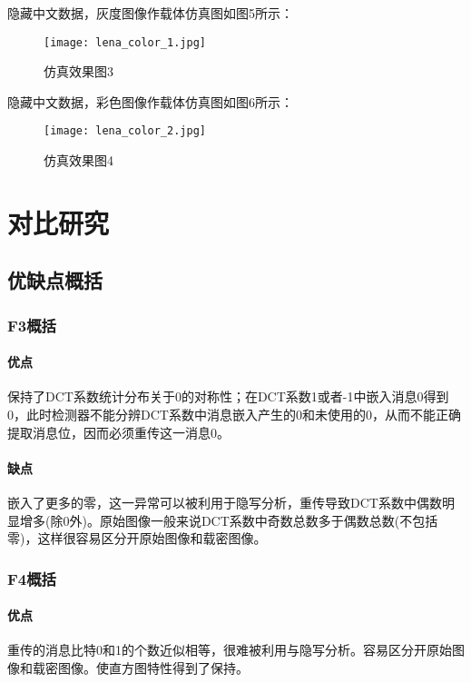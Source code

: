 \documentclass[onecolumn,a4paper,12pt]{article}
\begin{document}
隐藏中文数据，灰度图像作载体仿真图如图5所示：
\begin{figure}[H]
  \centering
  \texttt{[image: lena\_color\_1.jpg]}\\
  \caption{仿真效果图3}\label{仿真效果图3}
\end{figure}

隐藏中文数据，彩色图像作载体仿真图如图6所示：
\begin{figure}[H]
  \centering
  \texttt{[image: lena\_color\_2.jpg]}\\
  \caption{仿真效果图4}\label{仿真效果图4}
\end{figure}


\section{对比研究}

\subsection{优缺点概括}

\subsubsection{F3概括}

\paragraph*{优点}
保持了DCT系数统计分布关于0的对称性；在DCT系数1或者-1中嵌入消息0得到0，此时检测器不能分辨DCT系数中消息嵌入产生的0和未使用的0，从而不能正确提取消息位，因而必须重传这一消息0。

\paragraph*{缺点}
嵌入了更多的零，这一异常可以被利用于隐写分析，重传导致DCT系数中偶数明显增多(除0外)。原始图像一般来说DCT系数中奇数总数多于偶数总数(不包括零)，这样很容易区分开原始图像和载密图像。

\subsubsection{F4概括}

\paragraph*{优点}
重传的消息比特0和1的个数近似相等，很难被利用与隐写分析。容易区分开原始图像和载密图像。使直方图特性得到了保持。
\end{document}
